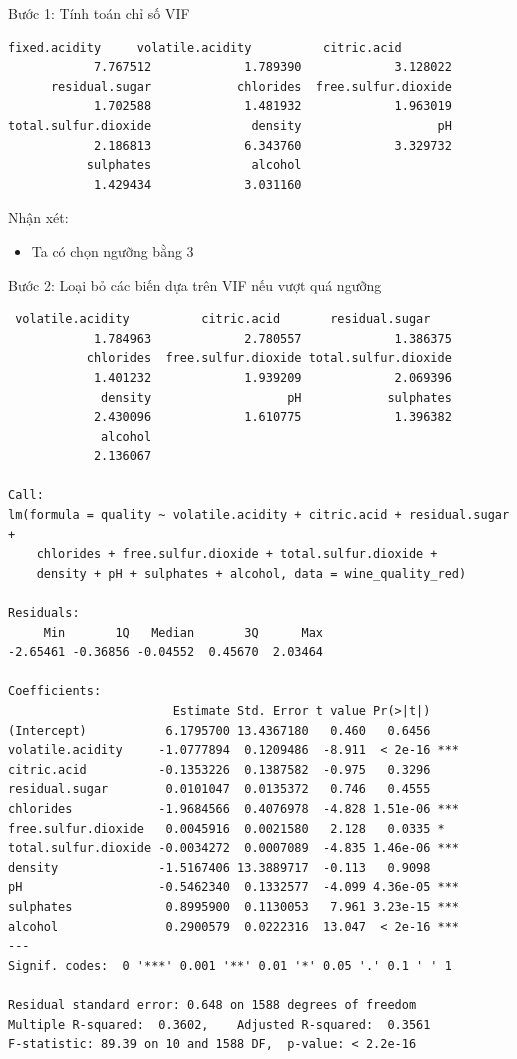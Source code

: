 Bước 1: Tính toán chỉ số VIF
\begin{lstlisting}
fixed.acidity     volatile.acidity          citric.acid 
            7.767512             1.789390             3.128022 
      residual.sugar            chlorides  free.sulfur.dioxide 
            1.702588             1.481932             1.963019 
total.sulfur.dioxide              density                   pH 
            2.186813             6.343760             3.329732 
           sulphates              alcohol 
            1.429434             3.031160 
\end{lstlisting}
Nhận xét:
\begin{itemize}
    \item Ta có chọn ngưỡng bằng 3
\end{itemize}
Bước 2: Loại bỏ các biến dựa trên VIF nếu vượt quá ngưỡng
\begin{lstlisting}
 volatile.acidity          citric.acid       residual.sugar 
            1.784963             2.780557             1.386375 
           chlorides  free.sulfur.dioxide total.sulfur.dioxide 
            1.401232             1.939209             2.069396 
             density                   pH            sulphates 
            2.430096             1.610775             1.396382 
             alcohol 
            2.136067 

Call:
lm(formula = quality ~ volatile.acidity + citric.acid + residual.sugar + 
    chlorides + free.sulfur.dioxide + total.sulfur.dioxide + 
    density + pH + sulphates + alcohol, data = wine_quality_red)

Residuals:
     Min       1Q   Median       3Q      Max 
-2.65461 -0.36856 -0.04552  0.45670  2.03464 

Coefficients:
                       Estimate Std. Error t value Pr(>|t|)    
(Intercept)           6.1795700 13.4367180   0.460   0.6456    
volatile.acidity     -1.0777894  0.1209486  -8.911  < 2e-16 ***
citric.acid          -0.1353226  0.1387582  -0.975   0.3296    
residual.sugar        0.0101047  0.0135372   0.746   0.4555    
chlorides            -1.9684566  0.4076978  -4.828 1.51e-06 ***
free.sulfur.dioxide   0.0045916  0.0021580   2.128   0.0335 *  
total.sulfur.dioxide -0.0034272  0.0007089  -4.835 1.46e-06 ***
density              -1.5167406 13.3889717  -0.113   0.9098    
pH                   -0.5462340  0.1332577  -4.099 4.36e-05 ***
sulphates             0.8995900  0.1130053   7.961 3.23e-15 ***
alcohol               0.2900579  0.0222316  13.047  < 2e-16 ***
---
Signif. codes:  0 '***' 0.001 '**' 0.01 '*' 0.05 '.' 0.1 ' ' 1

Residual standard error: 0.648 on 1588 degrees of freedom
Multiple R-squared:  0.3602,	Adjusted R-squared:  0.3561 
F-statistic: 89.39 on 10 and 1588 DF,  p-value: < 2.2e-16
\end{lstlisting}


